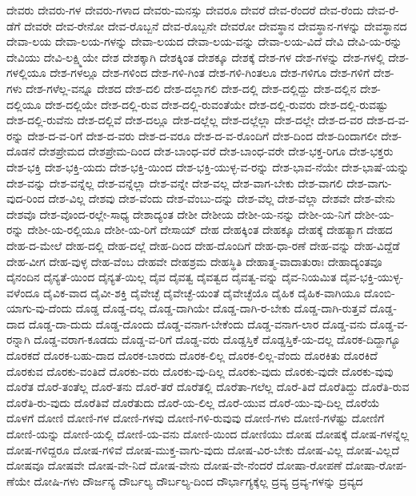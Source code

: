 {ದೇವರು
ದೇವರು-ಗಳ
ದೇವರು-ಗಳಾದ
ದೇವರು-ಮನಸ್ಸು
ದೇವರೂ
ದೇವರೆ
ದೇವ-ರೆಂದರೆ
ದೇವ-ರೆಂದು
ದೇವ-ರೆ-ಡೆಗೆ
ದೇವರೇ
ದೇವ-ರೇನೋ
ದೇವ-ರೊಬ್ಬನೆ
ದೇವ-ರೊಬ್ಬನೇ
ದೇವರೋ
ದೇವಸ್ಥಾನ
ದೇವಸ್ಥಾನ-ಗಳನ್ನು
ದೇವಸ್ಥಾನದ
ದೇವಾ-ಲಯ
ದೇವಾ-ಲಯ-ಗಳನ್ನು
ದೇವಾ-ಲಯದ
ದೇವಾ-ಲಯ-ವನ್ನು
ದೇವಾ-ಲಯ-ವಿದೆ
ದೇವಿ
ದೇವಿ-ಯ-ರನ್ನು
ದೇವಿಯು
ದೇವಿ-ಲಕ್ಷ್ಮಿಯೇ
ದೇಶ
ದೇಶಕ್ಕಾಗಿ
ದೇಶಕ್ಕಿಂತ
ದೇಶಕ್ಕೂ
ದೇಶಕ್ಕೆ
ದೇಶ-ಗಳ
ದೇಶ-ಗಳನ್ನು
ದೇಶ-ಗಳಲ್ಲಿ
ದೇಶ-ಗಳಲ್ಲಿಯೂ
ದೇಶ-ಗಳಲ್ಲೂ
ದೇಶ-ಗಳಿಂದ
ದೇಶ-ಗಳಿ-ಗಿಂತ
ದೇಶ-ಗಳಿ-ಗಿಂತಲೂ
ದೇಶ-ಗಳಿಗೂ
ದೇಶ-ಗಳಿಗೆ
ದೇಶ-ಗಳು
ದೇಶ-ಗಳೆಲ್ಲ-ವನ್ನೂ
ದೇಶದ
ದೇಶ-ದಲಿ
ದೇಶ-ದಲ್ಲಾಗಲಿ
ದೇಶ-ದಲ್ಲಿ
ದೇಶ-ದಲ್ಲಿದ್ದು
ದೇಶ-ದಲ್ಲಿನ
ದೇಶ-ದಲ್ಲಿಯೂ
ದೇಶ-ದಲ್ಲಿಯೇ
ದೇಶ-ದಲ್ಲಿ-ರುವ
ದೇಶ-ದಲ್ಲಿ-ರುವಂತೆಯೇ
ದೇಶ-ದಲ್ಲಿ-ರುವರು
ದೇಶ-ದಲ್ಲಿ-ರುವಷ್ಟು
ದೇಶ-ದಲ್ಲಿ-ರುವೆನು
ದೇಶ-ದಲ್ಲಿವೆ
ದೇಶ-ದಲ್ಲೂ
ದೇಶ-ದಲ್ಲೆಲ್ಲ
ದೇಶ-ದಲ್ಲೆಲ್ಲಾ
ದೇಶ-ದಲ್ಲೇ
ದೇಶ-ದ-ವರ
ದೇಶ-ದ-ವ-ರನ್ನು
ದೇಶ-ದ-ವ-ರಿಗೆ
ದೇಶ-ದ-ವರು
ದೇಶ-ದ-ವರೂ
ದೇಶ-ದ-ವ-ರೊಂದಿಗೆ
ದೇಶ-ದಿಂದ
ದೇಶ-ದಿಂದಾಗಲೀ
ದೇಶ-ದೊಡನೆ
ದೇಶಪ್ರೇಮದ
ದೇಶಪ್ರೇಮ-ದಿಂದ
ದೇಶ-ಬಾಂಧ-ವರೆ
ದೇಶ-ಬಾಂಧ-ವರೇ
ದೇಶ-ಭಕ್ತ-ರಿಗೂ
ದೇಶ-ಭಕ್ತರು
ದೇಶ-ಭಕ್ತಿ
ದೇಶ-ಭಕ್ತಿ-ಯದು
ದೇಶ-ಭಕ್ತಿ-ಯಿಂದ
ದೇಶ-ಭಕ್ತಿ-ಯುಳ್ಳ-ವ-ರನ್ನು
ದೇಶ-ಭಾವ-ನೆಯೇ
ದೇಶ-ಭಾಷೆ-ಯನ್ನು
ದೇಶ-ವನ್ನು
ದೇಶ-ವನ್ನೆಲ್ಲ
ದೇಶ-ವನ್ನೆಲ್ಲಾ
ದೇಶ-ವನ್ನೇ
ದೇಶ-ವಲ್ಲ
ದೇಶ-ವಾಗ-ಬೇಕು
ದೇಶ-ವಾಗಲಿ
ದೇಶ-ವಾಗು-ವುದ-ರಿಂದ
ದೇಶ-ವಿಲ್ಲ
ದೇಶವು
ದೇಶ-ವೆಂದು
ದೇಶ-ವೆಂಬು-ದನ್ನು
ದೇಶ-ವೆಲ್ಲ
ದೇಶ-ವೆಲ್ಲಾ
ದೇಶವೇ
ದೇಶ-ವೇನು
ದೇಶವೊ
ದೇಶ-ವೊಂದ-ರಲ್ಲೇ-ಸಾಧ್ಯ
ದೇಶಾದ್ಯಂತ
ದೇಶೀ
ದೇಶೀಯ
ದೇಶೀ-ಯ-ನನ್ನು
ದೇಶೀ-ಯ-ನಿಗೆ
ದೇಶೀ-ಯ-ರನ್ನು
ದೇಶೀ-ಯ-ರಲ್ಲಿಯೂ
ದೇಶೀ-ಯ-ರಿಗೆ
ದೇಸಾಯ್
ದೇಹ
ದೇಹಕ್ಕಿಂತ
ದೇಹಕ್ಕೂ
ದೇಹಕ್ಕೆ
ದೇಹತ್ಯಾಗ
ದೇಹದ
ದೇಹ-ದ-ಮೇಲೆ
ದೇಹ-ದಲ್ಲಿ
ದೇಹ-ದಲ್ಲೆ
ದೇಹ-ದಿಂದ
ದೇಹ-ದೊಂದಿಗೆ
ದೇಹ-ಧಾ-ರಣೆ
ದೇಹ-ವನ್ನು
ದೇಹ-ವಿದ್ದೆಡೆ
ದೇಹ-ವೀಗ
ದೇಹ-ವುಳ್ಳ
ದೇಹ-ವೆಂಬ
ದೇಹವೇ
ದೇಹಶ್ರಮ
ದೇಹಸ್ಥಿತಿ
ದೇಹಾತ್ಮ-ವಾದಾತುರಾಃ
ದೇಹಾದ್ಯಂತವೂ
ದೈನಂದಿನ
ದೈನ್ಯತೆ-ಯಿಂದ
ದೈನ್ಯತೆ-ಯಿಲ್ಲ
ದೈವ
ದೈವತ್ವ
ದೈವತ್ವದ
ದೈವತ್ವ-ವನ್ನು
ದೈವ-ನಿಯಮಿತ
ದೈವ-ಭಕ್ತಿ-ಯುಳ್ಳ-ವಳೆಂದೂ
ದೈವಿಕ-ವಾದ
ದೈವೀ-ಶಕ್ತಿ
ದೈವೇಚ್ಛೆ
ದೈವೇಚ್ಛೆ-ಯಂತೆ
ದೈವೇಚ್ಛೆಯೊ
ದೈಹಿಕ
ದೈಹಿಕ-ವಾಗಿಯೂ
ದೊಂಬಿ-ಯಾಗು-ವು-ದೆಂದು
ದೊಡ್ಡ
ದೊಡ್ಡ-ದಲ್ಲ
ದೊಡ್ಡ-ದಾಗಿಯೇ
ದೊಡ್ಡ-ದಾಗಿ-ರ-ಬೇಕು
ದೊಡ್ಡ-ದಾಗಿ-ರುತ್ತವೆ
ದೊಡ್ಡ-ದಾದ
ದೊಡ್ಡ-ದಾ-ದುದು
ದೊಡ್ಡ-ದೊಂದು
ದೊಡ್ಡ-ವನಾಗ-ಬೇಕೆಂದು
ದೊಡ್ಡ-ವನಾಗ-ಲಾರ
ದೊಡ್ಡ-ವನು
ದೊಡ್ಡ-ವ-ರನ್ನಾಗಿ
ದೊಡ್ಡ-ವರಾಗ-ಕೂಡದು
ದೊಡ್ಡ-ವ-ರಿಗೆ
ದೊಡ್ಡ-ವರು
ದೊಡ್ಡಸ್ತಿಕೆ
ದೊಡ್ಡಸ್ತಿಕೆ-ಯ-ದಲ್ಲ
ದೊರಕ-ದಿದ್ದಾಗ್ಯೂ
ದೊರಕದೆ
ದೊರಕ-ಬಹು-ದಾದ
ದೊರಕ-ಬಾರದು
ದೊರಕ-ಲಿಲ್ಲ
ದೊರಕ-ಲಿಲ್ಲ-ವೆಂದು
ದೊರಕಿತು
ದೊರಕಿದೆ
ದೊರಕುವ
ದೊರಕು-ವಂತಿದೆ
ದೊರಕು-ವರು
ದೊರಕು-ವು-ದಿಲ್ಲ
ದೊರಕು-ವುದು
ದೊರಕು-ವುದೇ
ದೊರಕು-ವುವು
ದೊರೆತ
ದೊರೆ-ತಂತೆಲ್ಲ
ದೊರೆ-ತನು
ದೊರೆ-ತರೆ
ದೊರೆತಲ್ಲಿ
ದೊರೆತಾ-ಗಲೆಲ್ಲ
ದೊರೆ-ತಿದೆ
ದೊರೆತಿದ್ದು
ದೊರೆತಿ-ರುವ
ದೊರೆತಿ-ರು-ವುದು
ದೊರೆತಿವೆ
ದೊರೆತುದು
ದೊರೆ-ಯ-ಲಿಲ್ಲ
ದೊರೆ-ಯುವ
ದೊರೆ-ಯು-ವು-ದಿಲ್ಲ
ದೊರೆಯೆ
ದೊಳಗೆ
ದೋಣಿ
ದೋಣಿ-ಗಳ
ದೋಣಿ-ಗಳವು
ದೋಣಿ-ಗಳಿ-ರುವುವು
ದೋಣಿ-ಗಳು
ದೋಣಿ-ಗಳೆಷ್ಟು
ದೋಣಿಗೆ
ದೋಣಿ-ಯನ್ನು
ದೋಣಿ-ಯಲ್ಲಿ
ದೋಣಿ-ಯ-ವನು
ದೋಣಿ-ಯಿಂದ
ದೋಣಿಯು
ದೋಷ
ದೋಷಕ್ಕೆ
ದೋಷ-ಗಳನ್ನೆಲ್ಲ
ದೋಷ-ಗಳಿದ್ದರೂ
ದೋಷ-ಗಳಿವೆ
ದೋಷ-ಮುಕ್ತ-ವಾಗು-ವುದು
ದೋಷ-ವಿರ-ಬೇಕು
ದೋಷ-ವಿಲ್ಲ
ದೋಷ-ವಿಲ್ಲದೆ
ದೋಷವೂ
ದೋಷವೇ
ದೋಷ-ವೇ-ನಿದೆ
ದೋಷ-ವೇನು
ದೋಷ-ವೇ-ನೆಂದರೆ
ದೋಷಾ-ರೋಪಣೆ
ದೋಷಾ-ರೋಪ-ಣೆಯೇ
ದೋಷಿ-ಗಳು
ದೌರ್ಜನ್ಯ
ದೌರ್ಬಲ್ಯ
ದೌರ್ಬಲ್ಯ-ದಿಂದ
ದೌರ್ಭಾಗ್ಯಕ್ಕೆಲ್ಲ
ದ್ರವ್ಯ
ದ್ರವ್ಯ-ಗಳನ್ನು
ದ್ರವ್ಯದ
}
